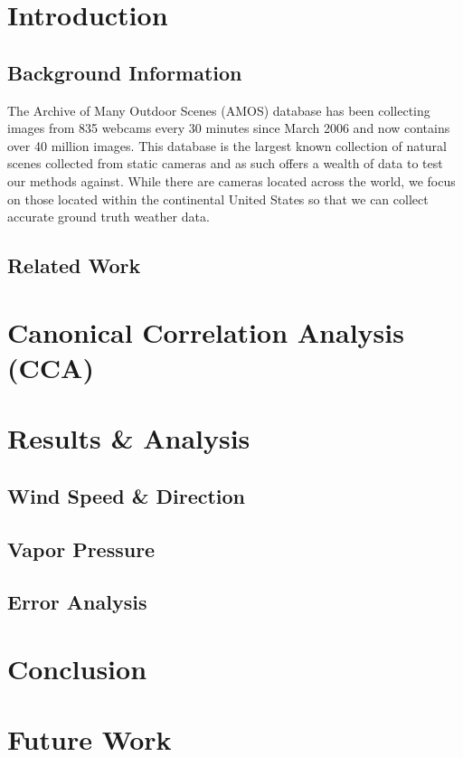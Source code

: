 \chapter{Introduction}
\label{cpt:intro}

\section{Background Information}
The Archive of Many Outdoor Scenes (AMOS) database \cite{jacobs07amos} has been collecting images from 835 webcams every 30 minutes since March 2006 and now contains over 40 million images. This database is the largest known collection of natural scenes collected from static cameras and as such offers a wealth of data to test our methods against. While there are cameras located across the world, we focus on those located within the continental United States so that we can collect accurate ground truth weather data.
\section{Related Work}

\chapter{Canonical Correlation Analysis (CCA)}
\label{cpt:cca}

\chapter{Results \& Analysis}
\label{cpt:results}

\section{Wind Speed \& Direction}

\section{Vapor Pressure}

\section{Error Analysis}

\chapter{Conclusion}
\label{cpt:conclusion}

\chapter{Future Work}
\label{cpt:future}